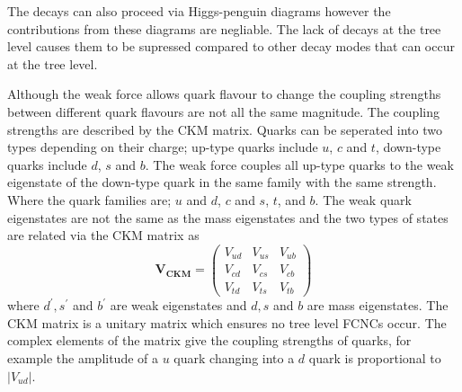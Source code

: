 The decays can also proceed via Higgs-penguin diagrams however the contributions from these diagrams are negliable. %
The lack of \bmumu decays at the tree level causes them to be supressed compared to other \bsd decay modes that can occur at the tree level.





Although the weak force allows quark flavour to change the coupling strengths between different quark flavours are not all the same magnitude. The coupling strengths are described by the CKM matrix. Quarks can be seperated into two types depending on their charge; up-type quarks include $u$, $c$ and $t$, down-type quarks include $d$, $s$ and $b$. The weak force couples all up-type quarks to the weak eigenstate of the down-type quark in the same family with the same strength. Where the quark families are; $u$ and $d$, $c$ and $s$, $t$, and $b$. The weak quark eigenstates are not the same as the mass eigenstates and the two types of states are related via the CKM matrix as
\begin{equation}
\mathbf{V_{CKM}} =
 \begin{pmatrix}
   V_{ud} & V_{us} & V_{ub} \\
   V_{cd} & V_{cs} & V_{cb} \\
   V_{td} & V_{ts} & V_{tb}
 \end{pmatrix}
\label{eq:CKMA}
\end{equation}
where $d^', s^'$ and $b^'$ are weak eigenstates and $d, s$ and $b$ are mass eigenstates. The CKM matrix is a unitary matrix which ensures no tree level FCNCs occur. The complex elements of the matrix give the coupling strengths of quarks, for example the amplitude of a $u$ quark changing into a $d$ quark is proportional to $|V_{ud}|$.

